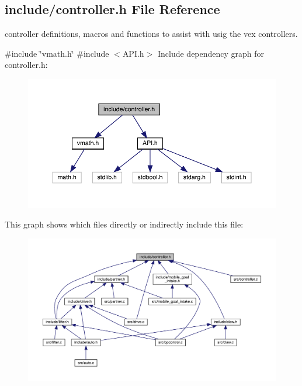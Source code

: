 \subsection{include/controller.h File Reference}
\label{controller_8h}


controller definitions, macros and functions to assist with usig the vex controllers.  


{\ttfamily \#include \char`\"{}vmath.\+h\char`\"{}}\newline
{\ttfamily \#include $<$A\+P\+I.\+h$>$}\newline
Include dependency graph for controller.\+h\+:\nopagebreak
\begin{figure}[H]
\begin{center}
\leavevmode
\includegraphics[width=350pt]{controller_8h__incl}
\end{center}
\end{figure}
This graph shows which files directly or indirectly include this file\+:\nopagebreak
\begin{figure}[H]
\begin{center}
\leavevmode
\includegraphics[width=350pt]{controller_8h__dep__incl}
\end{center}
\end{figure}
